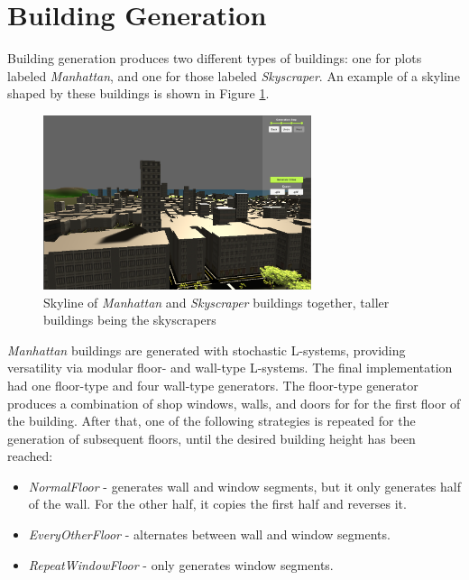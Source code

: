 \section{Building Generation}


Building generation produces two different types of buildings: one for plots labeled \textit{Manhattan}, and one for those labeled \textit{Skyscraper}. 
An example of a skyline shaped by these buildings is shown in Figure \ref{fig:skyline-result}.

\begin{figure}[H]
  \centering

  \includegraphics[width=0.7\textwidth]{figure/skyline.PNG}
  \caption{Skyline of \textit{Manhattan} and \textit{Skyscraper} buildings together, taller buildings being the skyscrapers}

  \label{fig:skyline-result}
\end{figure}

\textit{Manhattan} buildings are generated with stochastic L-systems, providing versatility via modular floor- and wall-type L-systems.
The final implementation had one floor-type and four wall-type generators.
The floor-type generator produces a combination of shop windows, walls, and doors for for the first floor of the building.
After that, one of the following strategies is repeated for the generation of subsequent floors, until the desired building height has been reached:

\begin{itemize}
  \item \textit{NormalFloor} - generates wall and window segments, but it only generates half of the wall. For the other half, it copies the first half and reverses it. 
  \item \textit{EveryOtherFloor} - alternates between wall and window segments.
  \item \textit{RepeatWindowFloor} - only generates window segments.
\end{itemize}

